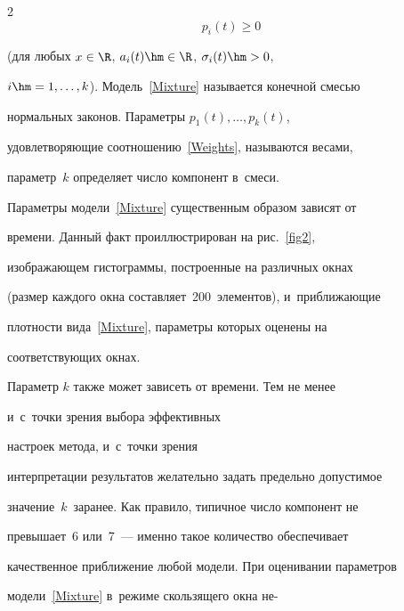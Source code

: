 \begin{multicols}{2}
\begin{equation}
p_{i}(t)\geqslant 0 \label{Weights}


\end{equation}


(для любых $x \in \R$,  $a_i(t)\hm\in\R$, $\sigma_i(t)\hm>0$,


$i\hm=1,\ldots,k$). Модель~\eqref{Mixture} называется конечной смесью


нормальных законов. Параметры $p_{1}(t),\ldots,p_{k}(t)$,


удовлетворяющие соотношению~\eqref{Weights}, называются весами,


параметр~$k$ определяет число компонент в~смеси.





Параметры модели~\eqref{Mixture} существенным образом зависят от


времени. Данный факт проиллюстрирован на рис.~\ref{fig2},


изображающем гистограммы, построенные на различных окнах


(размер каждого окна составляет~200~элементов), и~приближающие


плотности вида~\eqref{Mixture}, параметры которых оценены на


соответствующих окнах.











Параметр  $k$ также может зависеть от времени. Тем не менее 


и~с~точки зрения выбора эффективных


 настроек метода, и~с~точки зрения


интерпретации результатов желательно задать предельно допустимое


значение~$k$~заранее. Как правило, типичное чис\-ло компонент не


превышает~6 или~7~--- именно  такое количество обеспечивает


качественное приближение любой модели. При оценивании параметров


модели~\eqref{Mixture} в~режиме скользящего окна не-\linebreak\vspace*{-12pt}





\pagebreak





\end{multicols}





